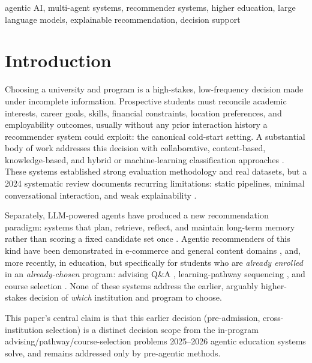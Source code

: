 \documentclass[conference]{IEEEtran}
\begin{document}
\begin{IEEEkeywords}
agentic AI, multi-agent systems, recommender systems, higher education, large language
models, explainable recommendation, decision support
\end{IEEEkeywords}

\section{Introduction}
\label{sec:intro}

Choosing a university and program is a high-stakes, low-frequency decision made under
incomplete information. Prospective students must reconcile academic interests, career
goals, skills, financial constraints, location preferences, and employability outcomes,
usually without any prior interaction history a recommender system could exploit: the
canonical cold-start setting. A substantial body of work addresses this decision with
collaborative, content-based, knowledge-based, and hybrid or machine-learning
classification approaches \cite{hrspca,studieme,multidmensionalrecsysuni,companalysisrecsys,
universityrecsyselahi,bertopicprogramrec}. These systems established strong evaluation
methodology and real datasets, but a 2024 systematic review documents recurring
limitations: static pipelines, minimal conversational interaction, and weak explainability
\cite{recommendersyshighered}.

Separately, LLM-powered agents have produced a new recommendation paradigm: systems that
plan, retrieve, reflect, and maintain long-term memory rather than scoring a fixed candidate
set once \cite{llmagentrecsyssurvey}. Agentic recommenders of this kind have been
demonstrated in e-commerce and general content domains
\cite{agenticaiframeworkrecommendersystem,taurecbenchmark,ragpersonalisedrecommendations},
and, more recently, in education, but specifically for
students who are \emph{already enrolled} in an \emph{already-chosen} program: advising
Q\&A \cite{advisingwise}, learning-pathway sequencing \cite{agenticedurec}, and course
selection \cite{onlinecoursemaskg}. None of these systems address the earlier, arguably
higher-stakes decision of \emph{which} institution and program to choose.

This paper's central claim is that this earlier decision (pre-admission, cross-institution
selection) is a distinct decision scope from the in-program advising/pathway/course-selection
problems 2025--2026 agentic education systems solve, and remains addressed only by
pre-agentic methods.
\end{document}

